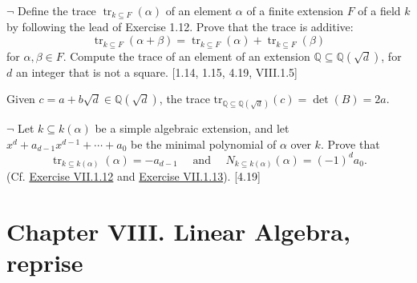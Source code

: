 \documentclass[12pt,letterpaper,boxed]{hmcpset}
\begin{document}
\hypertarget{Exercise VII.1.13}{}
\begin{problem}[1.13]
$\neg$ Define the trace $\operatorname{tr}_{k \subseteq F}(\alpha)$ of an element $\alpha$ of a finite extension $F$ of a field $k$ by following the lead of Exercise 1.12. Prove that the trace is additive:
$$
\operatorname{tr}_{k \subseteq F}(\alpha+\beta)=\operatorname{tr}_{k \subseteq F}(\alpha)+\operatorname{tr}_{k \subseteq F}(\beta)
$$
for $\alpha, \beta \in F$. Compute the trace of an element of an extension $\mathbb{Q} \subseteq \mathbb{Q}(\sqrt{d})$, for $d$ an integer that is not a square. [1.14, 1.15, 4.19, VIII.1.5]
\end{problem}
\begin{solution}
	Given $c=a+b\sqrt{d}\in \mathbb{Q}\left(\sqrt{d}\right)$, the trace $\mathrm{tr}_{\mathbb{Q} \subseteq \mathbb{Q}(\sqrt{d})}(c)=\det(B)=2a$.
\end{solution}

\begin{problem}[1.14]
$\neg$ Let $k \subseteq k(\alpha)$ be a simple algebraic extension, and let $x^{d}+a_{d-1} x^{d-1}+\cdots+a_{0}$ be the minimal polynomial of $\alpha$ over $k$. Prove that
$$
\operatorname{tr}_{k \subseteq k(\alpha)}(\alpha)=-a_{d-1} \quad \text { and } \quad N_{k \subseteq k(\alpha)}(\alpha)=(-1)^{d} a_{0} .
$$
(Cf. \hyperlink{Exercise VII.1.12}{Exercise VII.1.12} and \hyperlink{Exercise VII.1.13}{Exercise VII.1.13}). [4.19]
\end{problem}


\newpage
\section{Chapter VIII.\hspace{0.2em} Linear Algebra, reprise}
\end{document}

